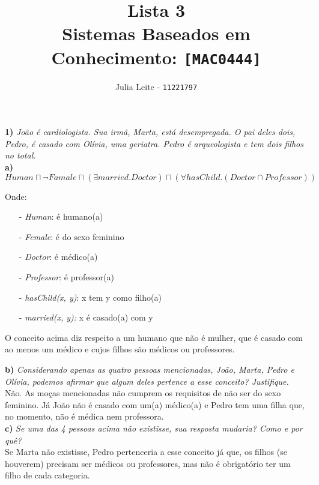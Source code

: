 \documentclass{article}
\title{Lista 3\\
\large Sistemas Baseados em Conhecimento: \texttt{[MAC0444]}}
\author{Julia Leite - \texttt{11221797}}
\begin{document}
    
\maketitle

\textbf{1)} \textit{João é cardiologista. Sua irmã, Marta, está desempregada. O pai deles dois, Pedro, 
é casado com Olívia, uma geriatra. Pedro é arqueologista e tem dois filhos no total.}\\

\textbf{a)} $Human \sqcap \neg Famale \sqcap (\exists married.Doctor) \sqcap (\forall hasChild.(Doctor \cap Professor))$

Onde:

\begin{itemize}
    \item [-] \textit{Human}: é humano(a)
    \item [-] \textit{Female}: é do sexo feminino
    \item [-] \textit{Doctor}: é médico(a)
    \item [-] \textit{Professor}: é professor(a)
    \item [-] \textit{hasChild(x, y)}: x tem y como filho(a)
    \item [-] \textit{married(x, y):} x é casado(a) com y
\end{itemize}

O conceito acima diz respeito a um humano que não é mulher, que é casado com ao menos um médico e cujos filhos são médicos ou professores.

\textbf{b)} \textit{Considerando apenas as quatro pessoas mencionadas, João, Marta, Pedro
e Olívia, podemos afirmar que algum deles pertence a esse conceito? Justifique.}\\

Não. As moças mencionadas não cumprem os requisitos de não ser do sexo feminino. Já João não é
casado com um(a) médico(a) e Pedro tem uma filha que, no momento, não é médica nem professora.\\

\textbf{c)} \textit{Se uma das 4 pessoas acima não existisse, sua resposta mudaria? Como e por quê?}\\

Se Marta não existisse, Pedro pertenceria a esse conceito já que, os filhos (se houverem) precisam ser médicos ou 
professores, mas não é obrigatório ter um filho de cada categoria.\\
\end{document}
